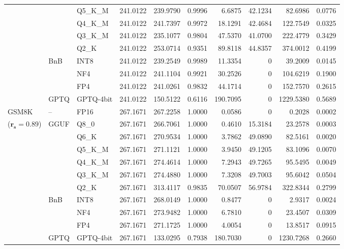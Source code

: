 \begin{table}[t]
{\begin{tabular}{ll l rrrrrrr}
 &  & Q5\_K\_M & 241.0122 & 239.9790 & 0.9996 & 6.6875 & 42.1234 & 82.6986 & 0.0776 \\
 &  & Q4\_K\_M & 241.0122 & 241.7397 & 0.9972 & 18.1291 & 42.4684 & 122.7549 & 0.0325 \\
 &  & Q3\_K\_M & 241.0122 & 235.1077 & 0.9804 & 47.5370 & 41.0700 & 222.4779 & 0.3429 \\
 &  & Q2\_K & 241.0122 & 253.0714 & \cellcolor{red!18} 0.9351 & \cellcolor{red!18} 89.8118 & 44.8357 & \cellcolor{red!18} 374.0012 & \cellcolor{red!18} 0.4199 \\
 & BnB & INT8 & 241.0122 & 239.2549 & 0.9989 & 11.3354 & \cellcolor{cyan!12} $0$ & 39.2009 & 0.0145 \\
 &  & NF4 & 241.0122 & 241.1104 & 0.9921 & 30.2526 & \cellcolor{cyan!12} $0$ & 104.6219 & 0.1900 \\
 &  & FP4 & 241.0122 & 241.0261 & 0.9832 & 44.1714 & \cellcolor{cyan!12} $0$ & 152.7570 & 0.2615 \\
 & GPTQ & GPTQ-4bit & 241.0122 & 150.5122 & \cellcolor{red!35} 0.6116 & \cellcolor{red!35} 190.7095 & \cellcolor{cyan!12} $0$ & \cellcolor{red!35} 1229.5380 & \cellcolor{red!35} 0.5689 \\
\midrule
GSM8K & -- & FP16 & 267.1671 & 267.2258 & 1.0000 & 0.0586 & \cellcolor{cyan!12} $0$ & 0.2028 & 0.0002 \\
{\small ($\mathbf{r_s{=}0.89}$)} & GGUF & Q8\_0 & 267.1671 & 266.7061 & 1.0000 & 0.4610 & 15.3184 & 23.2578 & 0.0003 \\
 &  & Q6\_K & 267.1671 & 270.9534 & 1.0000 & 3.7862 & 49.0890 & 82.5161 & 0.0020 \\
 &  & Q5\_K\_M & 267.1671 & 271.1121 & 1.0000 & 3.9450 & 49.1205 & 83.1096 & 0.0070 \\
 &  & Q4\_K\_M & 267.1671 & 274.4614 & 1.0000 & 7.2943 & 49.7265 & 95.5495 & 0.0049 \\
 &  & Q3\_K\_M & 267.1671 & 274.4880 & 1.0000 & 7.3208 & 49.7003 & 95.6042 & 0.0504 \\
 &  & Q2\_K & 267.1671 & 313.4117 & 0.9835 & 70.0507 & 56.9784 & 322.8344 & 0.2799 \\
 & BnB & INT8 & 267.1671 & 268.0149 & 1.0000 & 0.8477 & \cellcolor{cyan!12} $0$ & 2.9317 & 0.0024 \\
 &  & NF4 & 267.1671 & 273.9482 & 1.0000 & 6.7810 & \cellcolor{cyan!12} $0$ & 23.4507 & 0.0309 \\
 &  & FP4 & 267.1671 & 271.1725 & 1.0000 & 4.0054 & \cellcolor{cyan!12} $0$ & 13.8517 & 0.0915 \\
 & GPTQ & GPTQ-4bit & 267.1671 & 133.0295 & \cellcolor{red!35} 0.7938 & \cellcolor{red!35} 180.7030 & \cellcolor{cyan!12} $0$ & \cellcolor{red!35} 1230.7268 & \cellcolor{red!35} 0.2660 \\
\bottomrule
\end{tabular}}
\end{table}